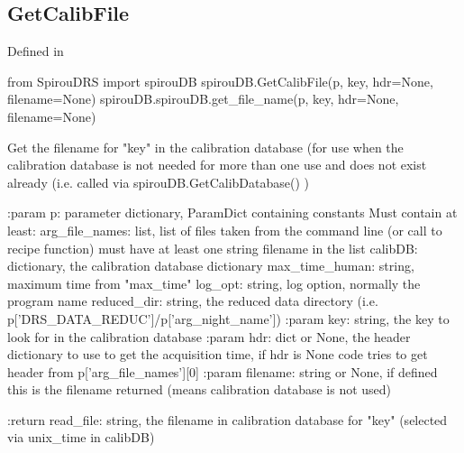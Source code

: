 \noindent\begin{minipage}{\textwidth}
\subsection{GetCalibFile}

Defined in \spirouCDB{}

\begin{pythonbox}
from SpirouDRS import spirouDB
spirouDB.GetCalibFile(p, key, hdr=None, filename=None)
spirouDB.spirouDB.get_file_name(p, key, hdr=None, filename=None)
\end{pythonbox}

\begin{pythondocstring}
Get the filename for "key" in the calibration database (for use when
the calibration database is not needed for more than one use and does
not exist already (i.e. called via spirouDB.GetCalibDatabase() )

:param p: parameter dictionary, ParamDict containing constants
    Must contain at least:
            arg_file_names: list, list of files taken from the command line
                            (or call to recipe function) must have at least
                            one string filename in the list
            calibDB: dictionary, the calibration database dictionary
            max_time_human: string, maximum time from "max_time"
            log_opt: string, log option, normally the program name
            reduced_dir: string, the reduced data directory
                         (i.e. p['DRS_DATA_REDUC']/p['arg_night_name'])
:param key: string, the key to look for in the calibration database
:param hdr: dict or None, the header dictionary to use to get the
            acquisition time, if hdr is None code tries to get
            header from p['arg_file_names'][0]
:param filename: string or None, if defined this is the filename returned
                 (means calibration database is not used)

:return read_file: string, the filename in calibration database for
                   "key" (selected via unix_time in calibDB)
\end{pythondocstring}
\end{minipage}

